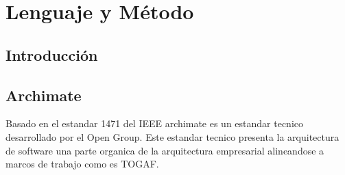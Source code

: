 \chapter{Lenguaje y Método}
\section{Introducción}
\newpage
\section{Archimate}
Basado en el estandar 1471 del IEEE archimate es un estandar tecnico desarrollado por el Open Group. Este estandar tecnico presenta la arquitectura de software una parte organica de la arquitectura empresarial alineandose a marcos de trabajo como es TOGAF.

\newpage
